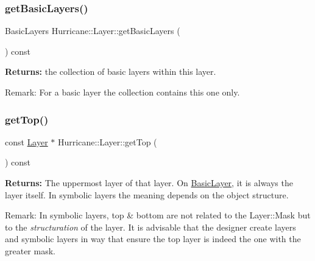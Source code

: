 \subsubsection{\texorpdfstring{get\+Basic\+Layers()}{getBasicLayers()}}
{\footnotesize\ttfamily Basic\+Layers Hurricane\+::\+Layer\+::get\+Basic\+Layers (\begin{DoxyParamCaption}{ }\end{DoxyParamCaption}) const\hspace{0.3cm}{\ttfamily [pure virtual]}}

{\bfseries Returns\+:} the collection of basic layers within this layer.

\begin{DoxyParagraph}{Remark\+: For a basic layer the collection contains this one only. }

\end{DoxyParagraph}
\mbox{\label{classHurricane_1_1Layer_a5f7c43a29f3dd02a9ebccbcbf91d6727}} 
\subsubsection{\texorpdfstring{get\+Top()}{getTop()}}
{\footnotesize\ttfamily const \mbox{\hyperlink{classHurricane_1_1Layer}{Layer}} $\ast$ Hurricane\+::\+Layer\+::get\+Top (\begin{DoxyParamCaption}{ }\end{DoxyParamCaption}) const\hspace{0.3cm}{\ttfamily [virtual]}}

{\bfseries Returns\+:} The uppermost layer of that layer. On \mbox{\hyperlink{classHurricane_1_1BasicLayer}{Basic\+Layer}}, it is always the layer itself. In symbolic layers the meaning depends on the object structure.

\begin{DoxyParagraph}{Remark\+: In symbolic layers, top \& bottom are not related to the Layer\+:\+:Mask}
but to the {\itshape structuration} of the layer. It is advisable that the designer create layers and symbolic layers in way that ensure the top layer is indeed the one with the greater mask. 
\end{DoxyParagraph}
\mbox{\label{classHurricane_1_1Layer_a4dab4552a219d2d900ed0b1245dc6580}} 
